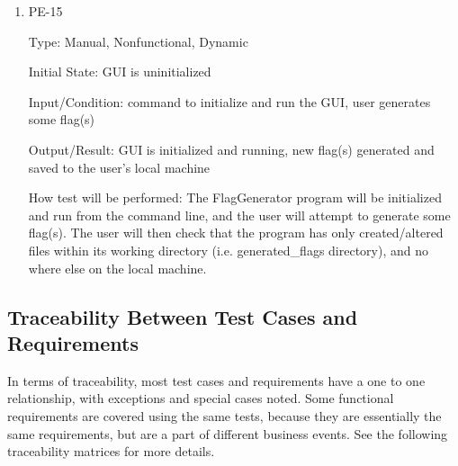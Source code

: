 \documentclass[12pt, titlepage]{article}
\begin{document}
\begin{enumerate}

\item{PE-15\\}

Type: Manual, Nonfunctional, Dynamic

Initial State: GUI is uninitialized

Input/Condition: command to initialize and run the GUI, user generates some
flag(s)

Output/Result: GUI is initialized and running, new flag(s) generated and saved
to the user's local machine

How test will be performed: The FlagGenerator program will be initialized and
run from the command line, and the user will attempt to generate some flag(s).
The user will then check that the program has only created/altered files
within its working directory (i.e. generated\_flags directory), and no where
else on the local machine.

\end{enumerate}

\subsection{Traceability Between Test Cases and Requirements}

In terms of traceability, most test cases and requirements have a one to one
relationship, with exceptions and special cases noted. Some functional
requirements are covered using the same tests, because they are essentially
the same requirements, but are a part of different business events. See the
following traceability matrices for more details.
\end{document}
